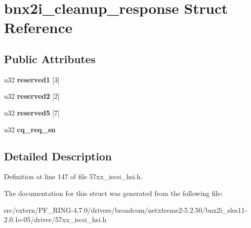 \hypertarget{structbnx2i__cleanup__response}{
\section{bnx2i\_\-cleanup\_\-response Struct Reference}
\label{structbnx2i__cleanup__response}
}
\subsection*{Public Attributes}
\begin{DoxyCompactItemize}
\item 
\hypertarget{structbnx2i__cleanup__response_a9a5aaacccdfa75040dc4a82de95fdc75}{
u32 {\bfseries reserved1} \mbox{[}3\mbox{]}}
\label{structbnx2i__cleanup__response_a9a5aaacccdfa75040dc4a82de95fdc75}

\item 
\hypertarget{structbnx2i__cleanup__response_a53d66e750d78664f03a6fb6505ec9f4a}{
u32 {\bfseries reserved2} \mbox{[}2\mbox{]}}
\label{structbnx2i__cleanup__response_a53d66e750d78664f03a6fb6505ec9f4a}

\item 
\hypertarget{structbnx2i__cleanup__response_a680cd3f73c62a41c30a532d6fbb72b76}{
u32 {\bfseries reserved5} \mbox{[}7\mbox{]}}
\label{structbnx2i__cleanup__response_a680cd3f73c62a41c30a532d6fbb72b76}

\item 
\hypertarget{structbnx2i__cleanup__response_a52bf483145fd7debe4b2945cce523353}{
u32 {\bfseries cq\_\-req\_\-sn}}
\label{structbnx2i__cleanup__response_a52bf483145fd7debe4b2945cce523353}

\end{DoxyCompactItemize}


\subsection{Detailed Description}


Definition at line 147 of file 57xx\_\-iscsi\_\-hsi.h.



The documentation for this struct was generated from the following file:\begin{DoxyCompactItemize}
\item 
src/extern/PF\_\-RING-\/4.7.0/drivers/broadcom/netxtreme2-\/5.2.50/bnx2i\_\-sles11-\/2.0.1e-\/05/driver/57xx\_\-iscsi\_\-hsi.h\end{DoxyCompactItemize}
